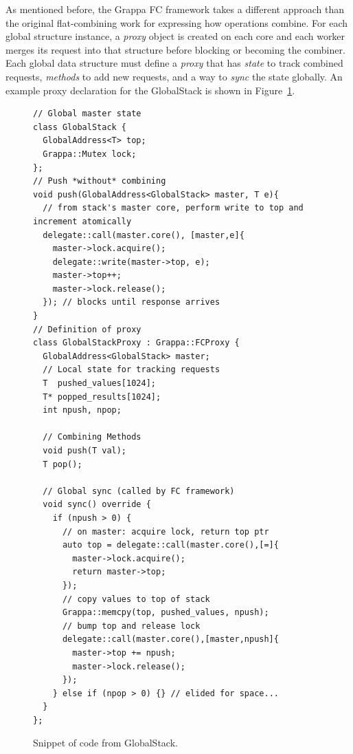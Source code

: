 As mentioned before, the Grappa FC framework takes a different approach than the original flat-combining work for expressing how operations combine.
For each global structure instance, a \emph{proxy} object is created on each core and each worker merges its request into that structure before blocking or becoming the combiner.
Each global data structure must define a \emph{proxy} that has \emph{state} to track combined requests, \emph{methods} to add new requests, and a way to \emph{sync} the state globally.
An example proxy declaration for the GlobalStack is shown in Figure~\ref{fig:push}.

\begin{figure}[t]
\centering
\begin{lstlisting}[style=grappa]
// Global master state
class GlobalStack {
  GlobalAddress<T> top;
  Grappa::Mutex lock;
};
// Push *without* combining
void push(GlobalAddress<GlobalStack> master, T e){
  // from stack's master core, perform write to top and increment atomically
  delegate::call(master.core(), [master,e]{
    master->lock.acquire();
    delegate::write(master->top, e);
    master->top++;
    master->lock.release();
  }); // blocks until response arrives
}
// Definition of proxy
class GlobalStackProxy : Grappa::FCProxy {
  GlobalAddress<GlobalStack> master;
  // Local state for tracking requests
  T  pushed_values[1024];
  T* popped_results[1024];
  int npush, npop;

  // Combining Methods 
  void push(T val);
  T pop();
  
  // Global sync (called by FC framework)
  void sync() override {
    if (npush > 0) {
      // on master: acquire lock, return top ptr
      auto top = delegate::call(master.core(),[=]{
        master->lock.acquire();
        return master->top;
      });
      // copy values to top of stack
      Grappa::memcpy(top, pushed_values, npush);
      // bump top and release lock
      delegate::call(master.core(),[master,npush]{
        master->top += npush;
        master->lock.release();
      });
    } else if (npop > 0) {} // elided for space...
  }
};
\end{lstlisting}
\caption{Snippet of code from GlobalStack.
}
\label{fig:push}
\end{figure}

